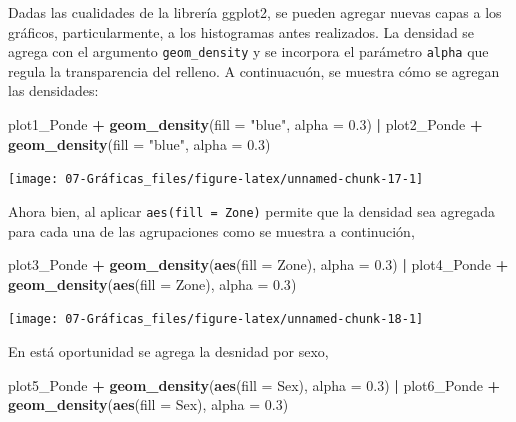 \documentclass[
  12pt,
]{book}
\newenvironment{Shaded}{\begin{snugshade}}{\end{snugshade}}
\newcommand{\AttributeTok}[1]{\textcolor[rgb]{0.13,0.29,0.53}{#1}}
\newcommand{\FloatTok}[1]{\textcolor[rgb]{0.00,0.00,0.81}{#1}}
\newcommand{\FunctionTok}[1]{\textcolor[rgb]{0.13,0.29,0.53}{\textbf{#1}}}
\newcommand{\NormalTok}[1]{#1}
\newcommand{\SpecialCharTok}[1]{\textcolor[rgb]{0.81,0.36,0.00}{\textbf{#1}}}
\newcommand{\StringTok}[1]{\textcolor[rgb]{0.31,0.60,0.02}{#1}}
\begin{document}
Dadas las cualidades de la librería ggplot2, se pueden agregar nuevas capas a los gráficos, particularmente, a los histogramas antes realizados. La densidad se agrega con el argumento \texttt{geom\_density} y se incorpora el parámetro \texttt{alpha} que regula la transparencia del relleno. A continuacuón, se muestra cómo se agregan las densidades:

\begin{Shaded}
\begin{Highlighting}[]
\NormalTok{plot1\_Ponde }\SpecialCharTok{+} \FunctionTok{geom\_density}\NormalTok{(}\AttributeTok{fill =} \StringTok{"blue"}\NormalTok{, }\AttributeTok{alpha =} \FloatTok{0.3}\NormalTok{) }\SpecialCharTok{|}
\NormalTok{  plot2\_Ponde }\SpecialCharTok{+} \FunctionTok{geom\_density}\NormalTok{(}\AttributeTok{fill =} \StringTok{"blue"}\NormalTok{, }\AttributeTok{alpha =} \FloatTok{0.3}\NormalTok{)}
\end{Highlighting}
\end{Shaded}

\begin{center}\texttt{[image: 07-Gráficas\_files/figure-latex/unnamed-chunk-17-1]} \end{center}

Ahora bien, al aplicar \texttt{aes(fill\ =\ Zone)} permite que la densidad sea agregada para cada una de las agrupaciones como se muestra a continución,

\begin{Shaded}
\begin{Highlighting}[]
\NormalTok{plot3\_Ponde }\SpecialCharTok{+} \FunctionTok{geom\_density}\NormalTok{(}\FunctionTok{aes}\NormalTok{(}\AttributeTok{fill =}\NormalTok{ Zone), }\AttributeTok{alpha =} \FloatTok{0.3}\NormalTok{) }\SpecialCharTok{|}
\NormalTok{  plot4\_Ponde }\SpecialCharTok{+} \FunctionTok{geom\_density}\NormalTok{(}\FunctionTok{aes}\NormalTok{(}\AttributeTok{fill =}\NormalTok{ Zone), }\AttributeTok{alpha =} \FloatTok{0.3}\NormalTok{)}
\end{Highlighting}
\end{Shaded}

\begin{center}\texttt{[image: 07-Gráficas\_files/figure-latex/unnamed-chunk-18-1]} \end{center}

En está oportunidad se agrega la desnidad por sexo,

\begin{Shaded}
\begin{Highlighting}[]
\NormalTok{plot5\_Ponde }\SpecialCharTok{+} \FunctionTok{geom\_density}\NormalTok{(}\FunctionTok{aes}\NormalTok{(}\AttributeTok{fill =}\NormalTok{ Sex), }\AttributeTok{alpha =} \FloatTok{0.3}\NormalTok{) }\SpecialCharTok{|}
\NormalTok{  plot6\_Ponde }\SpecialCharTok{+} \FunctionTok{geom\_density}\NormalTok{(}\FunctionTok{aes}\NormalTok{(}\AttributeTok{fill =}\NormalTok{ Sex), }\AttributeTok{alpha =} \FloatTok{0.3}\NormalTok{)}
\end{Highlighting}
\end{Shaded}
\end{document}
